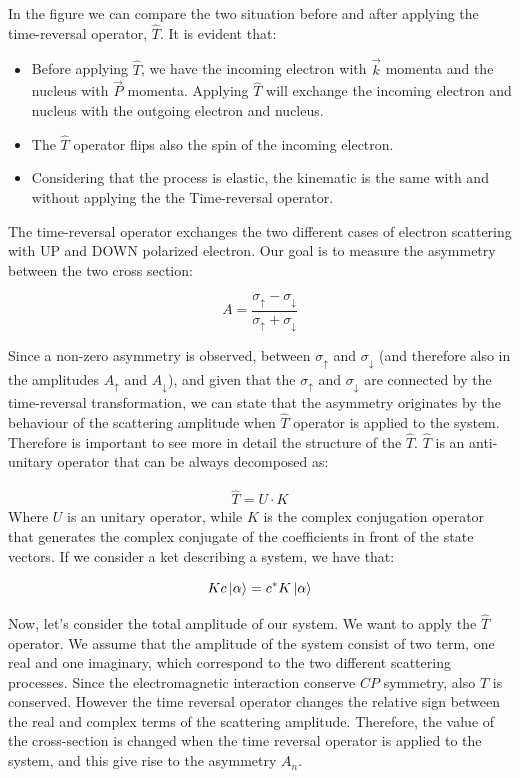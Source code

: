 In the figure we can compare the two situation before and after applying the time-reversal operator, $\hat{T}$. It is evident that: 

\begin{itemize}
\item Before applying $\hat{T}$, we have the incoming electron with $\vec{k}$ momenta and the nucleus with $\vec{P}$ momenta. Applying $\hat{T}$ will exchange the incoming electron and nucleus with the outgoing electron and nucleus.
\item The $\hat{T}$ operator flips also the spin of the incoming electron.
\item Considering that the process is elastic, the kinematic is the same with and without applying the the Time-reversal operator. 
\end{itemize}

The time-reversal operator exchanges the two different cases of electron scattering with UP and DOWN polarized electron. Our goal is to measure the asymmetry between the two cross section:

\begin{equation}
A = \frac{\sigma_{\uparrow} - \sigma_{\downarrow}}{\sigma_{\uparrow} + \sigma_{\downarrow}}
\end{equation}

Since a non-zero asymmetry is observed, between $\sigma_{\uparrow}$ and $\sigma_{\downarrow}$ (and therefore also in the amplitudes $A_{\uparrow}$ and $A_{\downarrow}$), and given that the $\sigma_{\uparrow}$ and $\sigma_{\downarrow}$ are connected by the time-reversal transformation, we can state that the asymmetry originates by the behaviour of the scattering amplitude when $\hat{T}$ operator is applied to the system. Therefore is important to see more in detail the structure of the $\hat{T}$. $\hat{T}$ is an anti-unitary operator that can be always decomposed as:

\begin{align*}
\hat{T} = U \cdot K
\end{align*} 
Where $U$ is an unitary operator, while $K$ is the complex conjugation operator that generates the complex conjugate of the coefficients in front of the state vectors. If we consider a ket describing a system, we have that:

\begin{equation}
Kc \ket{\alpha} = c^{*} K \ket{\alpha}
\end{equation}

Now, let's consider the total amplitude of our system. We want to apply the $\hat{T}$ operator. We assume that the amplitude of the system consist of two term, one real and one imaginary, which correspond to the two different scattering processes. Since the electromagnetic interaction conserve $CP$ symmetry, also $T$ is conserved. However the time reversal operator changes the relative sign between the real and complex terms of the scattering amplitude. Therefore, the value of the cross-section is changed when the time reversal operator is applied to the system, and this give rise to the asymmetry $A_{n}$.

